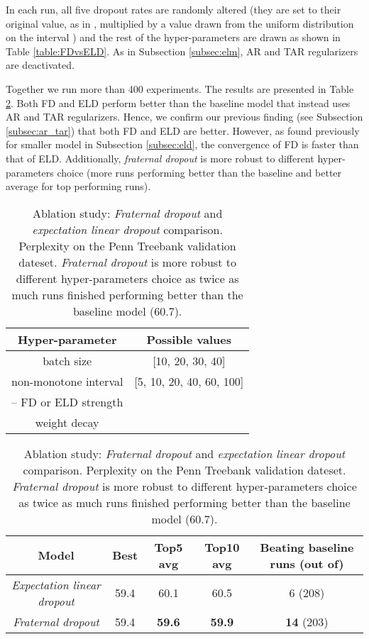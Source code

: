 \documentclass{article} \usepackage{iclr2018_conference,times}
\begin{document}
In each run, all five dropout rates are randomly altered (they are set to their original value, as in \cite{merity2017regularizing}, multiplied by a value drawn from the uniform distribution on the interval ) and the rest of the hyper-parameters are drawn as shown in Table \ref{table:FDvsELD}. As in Subsection \ref{subsec:elm}, AR and TAR regularizers are deactivated.

Together we run more than 400 experiments. The results are presented in Table \ref{table:FDvsELDresults}. Both FD and ELD perform better than the baseline model that instead uses AR and TAR regularizers. Hence, we confirm our previous finding (see Subsection \ref{subsec:ar_tar}) that both FD and ELD are better. However, as found previously for smaller model in Subsection \ref{subsec:eld}, the convergence of FD is faster than that of ELD. Additionally, \emph{fraternal dropout} is more robust to different hyper-parameters choice (more runs performing better than the baseline and better average for top performing runs).

\begin{table}[t]
\vspace{-0.08cm}
\centering
\begin{tabular}{c | c } 
\textbf{Hyper-parameter} & \textbf{Possible values}\\
\hline
batch size & [10, 20, 30, 40]\\
non-monotone interval & [5, 10, 20, 40, 60, 100]\\
 -- FD or ELD strength & \\
weight decay & 
\vspace{-0.08cm}
\end{tabular}
\caption{Ablation study: Candidate hyper-parameters possible used in the grid search for comparing \emph{fraternal dropout} and \emph{expectation linear dropout}.  is the uniform distribution on the interval . For finite sets, each value is drawn with equal probability.}
\label{table:FDvsELD}

\vspace{0.65cm}
\centering
\begin{tabular}{ c|c c c c}
\textbf{Model} & \textbf{Best} & \textbf{Top5 avg} & \textbf{Top10 avg} & \textbf{Beating baseline runs (out of)}\\
\hline
\emph{Expectation linear dropout} & 59.4 & 60.1 & 60.5 & 6 (208)\\
\emph{Fraternal dropout} & 59.4 & \textbf{59.6} & \textbf{59.9} & \textbf{14} (203)\\
\end{tabular}
\caption{Ablation study: \emph{Fraternal dropout} and \emph{expectation linear dropout} comparison. Perplexity on the Penn Treebank validation dateset. \emph{Fraternal dropout} is more robust to different hyper-parameters choice as twice as much runs finished performing better than the baseline model (60.7).}
\label{table:FDvsELDresults}
\vspace{-0.08cm}
\end{table}
\end{document}
